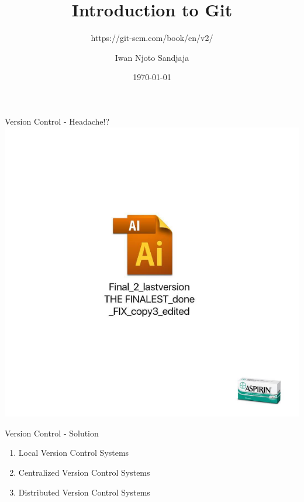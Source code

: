 \documentclass[10pt, compress]{beamer}
\title{Introduction to Git}
\subtitle{https://git-scm.com/book/en/v2/}
\date{\today}
\author{Iwan Njoto Sandjaja}
\institute{Petra Christian University}
\begin{document}
\maketitle

\begin{frame}{Version Control - Headache!?}
	\includegraphics[width=\textwidth*8/10]{images/aspirin}
\end{frame}

\begin{frame}{Version Control - Solution}
	\begin{enumerate}
		\item Local Version Control Systems
		\item Centralized Version Control Systems
		\item Distributed Version Control Systems
	\end{enumerate}
\end{frame}
\end{document}
